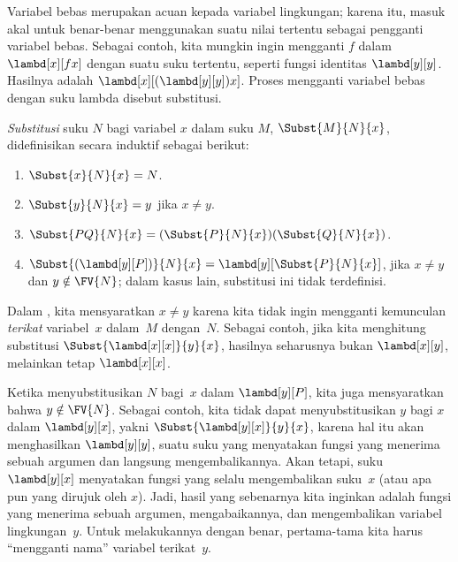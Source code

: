 \documentclass[../../../include/open-logic-section]{subfiles}
\begin{document}

\begin{explain}
Variabel bebas merupakan acuan kepada variabel lingkungan; karena itu, masuk
akal untuk benar-benar menggunakan suatu nilai tertentu sebagai pengganti
variabel bebas. Sebagai contoh, kita mungkin ingin mengganti $f$ dalam
$\lambd[x][f x]$ dengan suatu suku tertentu, seperti fungsi identitas
$\lambd[y][y]$. Hasilnya adalah $\lambd[x][(\lambd[y][y]) x]$. Proses
mengganti variabel bebas dengan suku lambda disebut substitusi.
\end{explain}

\begin{defn}[Substitusi] 
  \emph{Substitusi} suku $N$ bagi variabel $x$ dalam suku $M$,
  $\Subst{M}{N}{x}$, didefinisikan secara induktif sebagai berikut:
  \begin{enumerate}
    \item $\Subst{x}{N}{x} = N$. 
    \item $\Subst{y}{N}{x}  = y$ jika $x \neq y$. 
    \item $\Subst{PQ}{N}{x}  = (\Subst{P}{N}{x}) (\Subst{Q}{N}{x})$.
    \item $\Subst{(\lambd[y][P])}{N}{x} = \lambd[y][\Subst{P}{N}{x}]$,
      jika $x \neq y$ dan $y \notin \FV{N}$; dalam kasus lain, substitusi
      ini tidak terdefinisi.
  \end{enumerate}
\end{defn}

\begin{explain}
Dalam , kita mensyaratkan
$x \neq y$ karena kita tidak ingin mengganti kemunculan \emph{terikat}
variabel~$x$ dalam~$M$ dengan~$N$. Sebagai contoh, jika kita menghitung
substitusi $\Subst{\lambd[x][x]}{y}{x}$, hasilnya seharusnya bukan
$\lambd[x][y]$, melainkan tetap $\lambd[x][x]$.

Ketika menyubstitusikan $N$ bagi~$x$ dalam $\lambd[y][P]$, kita juga
mensyaratkan bahwa $y \notin \FV{N}$. Sebagai contoh, kita tidak dapat
menyubstitusikan $y$ bagi $x$ dalam $\lambd[y][x]$, yakni
$\Subst{\lambd[y][x]}{y}{x}$, karena hal itu akan menghasilkan
$\lambd[y][y]$, suatu suku yang menyatakan fungsi yang menerima sebuah
argumen dan langsung mengembalikannya. Akan tetapi, suku $\lambd[y][x]$
menyatakan fungsi yang selalu mengembalikan suku~$x$ (atau apa pun yang dirujuk
oleh $x$). Jadi, hasil yang sebenarnya kita inginkan adalah fungsi yang
menerima sebuah argumen, mengabaikannya, dan mengembalikan variabel
lingkungan~$y$. Untuk melakukannya dengan benar, pertama-tama kita harus
``mengganti nama'' variabel terikat~$y$.
\end{explain}
\end{document}
